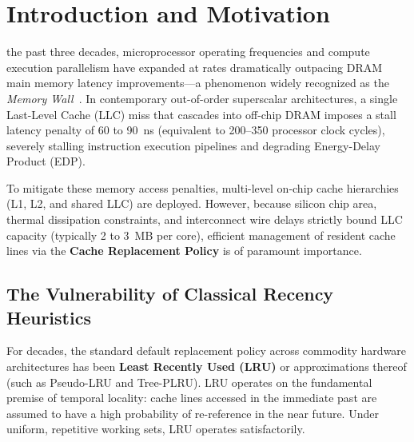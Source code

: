 \documentclass[conference]{IEEEtran}
\begin{document}
\section{Introduction and Motivation}
 the past three decades, microprocessor operating frequencies and compute execution parallelism have expanded at rates dramatically outpacing DRAM main memory latency improvements---a phenomenon widely recognized as the \textit{Memory Wall}~\cite{wulf1995hitting}. In contemporary out-of-order superscalar architectures, a single Last-Level Cache (LLC) miss that cascades into off-chip DRAM imposes a stall latency penalty of 60 to 90~ns (equivalent to 200--350 processor clock cycles), severely stalling instruction execution pipelines and degrading Energy-Delay Product (EDP). 

To mitigate these memory access penalties, multi-level on-chip cache hierarchies (L1, L2, and shared LLC) are deployed. However, because silicon chip area, thermal dissipation constraints, and interconnect wire delays strictly bound LLC capacity (typically 2 to 3~MB per core), efficient management of resident cache lines via the \textbf{Cache Replacement Policy} is of paramount importance.

\subsection{The Vulnerability of Classical Recency Heuristics}
For decades, the standard default replacement policy across commodity hardware architectures has been \textbf{Least Recently Used (LRU)} or approximations thereof (such as Pseudo-LRU and Tree-PLRU). LRU operates on the fundamental premise of temporal locality: cache lines accessed in the immediate past are assumed to have a high probability of re-reference in the near future. Under uniform, repetitive working sets, LRU operates satisfactorily.
\end{document}
